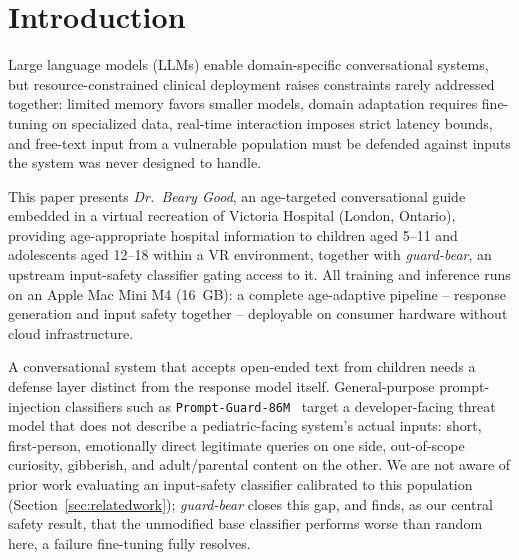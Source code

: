 \documentclass[pdflatex,sn-mathphys-num]{sn-jnl}%
\begin{document}

\maketitle

\section{Introduction}\label{sec1}

Large language models (LLMs) enable domain-specific conversational systems, but resource-constrained clinical deployment raises constraints rarely addressed together: limited memory favors smaller models, domain adaptation requires fine-tuning on specialized data, real-time interaction imposes strict latency bounds, and free-text input from a vulnerable population must be defended against inputs the system was never designed to handle.

This paper presents \textit{Dr.\ Beary Good}, an age-targeted conversational guide embedded in a virtual recreation of Victoria Hospital (London, Ontario), providing age-appropriate hospital information to children aged 5--11 and adolescents aged 12--18 within a VR environment, together with \textit{guard-bear}, an upstream input-safety classifier gating access to it. All training and inference runs on an Apple Mac Mini M4 (16~GB): a complete age-adaptive pipeline -- response generation and input safety together -- deployable on consumer hardware without cloud infrastructure.

A conversational system that accepts open-ended text from children needs a defense layer distinct from the response model itself. General-purpose prompt-injection classifiers such as \texttt{Prompt-Guard-86M}~\cite{promptguard2024} target a developer-facing threat model that does not describe a pediatric-facing system's actual inputs: short, first-person, emotionally direct legitimate queries on one side, out-of-scope curiosity, gibberish, and adult/parental content on the other. We are not aware of prior work evaluating an input-safety classifier calibrated to this population (Section~\ref{sec:relatedwork}); \textit{guard-bear} closes this gap, and finds, as our central safety result, that the unmodified base classifier performs worse than random here, a failure fine-tuning fully resolves.
\end{document}
